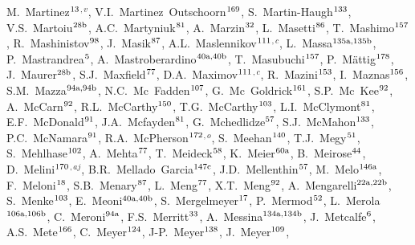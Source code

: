 \begin{flushleft}
M.~Martinez$^\textrm{\scriptsize 13}$$^{,v}$,
V.I.~Martinez~Outschoorn$^\textrm{\scriptsize 169}$,
S.~Martin-Haugh$^\textrm{\scriptsize 133}$,
V.S.~Martoiu$^\textrm{\scriptsize 28b}$,
A.C.~Martyniuk$^\textrm{\scriptsize 81}$,
A.~Marzin$^\textrm{\scriptsize 32}$,
L.~Masetti$^\textrm{\scriptsize 86}$,
T.~Mashimo$^\textrm{\scriptsize 157}$,
R.~Mashinistov$^\textrm{\scriptsize 98}$,
J.~Masik$^\textrm{\scriptsize 87}$,
A.L.~Maslennikov$^\textrm{\scriptsize 111}$$^{,c}$,
L.~Massa$^\textrm{\scriptsize 135a,135b}$,
P.~Mastrandrea$^\textrm{\scriptsize 5}$,
A.~Mastroberardino$^\textrm{\scriptsize 40a,40b}$,
T.~Masubuchi$^\textrm{\scriptsize 157}$,
P.~M\"attig$^\textrm{\scriptsize 178}$,
J.~Maurer$^\textrm{\scriptsize 28b}$,
S.J.~Maxfield$^\textrm{\scriptsize 77}$,
D.A.~Maximov$^\textrm{\scriptsize 111}$$^{,c}$,
R.~Mazini$^\textrm{\scriptsize 153}$,
I.~Maznas$^\textrm{\scriptsize 156}$,
S.M.~Mazza$^\textrm{\scriptsize 94a,94b}$,
N.C.~Mc~Fadden$^\textrm{\scriptsize 107}$,
G.~Mc~Goldrick$^\textrm{\scriptsize 161}$,
S.P.~Mc~Kee$^\textrm{\scriptsize 92}$,
A.~McCarn$^\textrm{\scriptsize 92}$,
R.L.~McCarthy$^\textrm{\scriptsize 150}$,
T.G.~McCarthy$^\textrm{\scriptsize 103}$,
L.I.~McClymont$^\textrm{\scriptsize 81}$,
E.F.~McDonald$^\textrm{\scriptsize 91}$,
J.A.~Mcfayden$^\textrm{\scriptsize 81}$,
G.~Mchedlidze$^\textrm{\scriptsize 57}$,
S.J.~McMahon$^\textrm{\scriptsize 133}$,
P.C.~McNamara$^\textrm{\scriptsize 91}$,
R.A.~McPherson$^\textrm{\scriptsize 172}$$^{,o}$,
S.~Meehan$^\textrm{\scriptsize 140}$,
T.J.~Megy$^\textrm{\scriptsize 51}$,
S.~Mehlhase$^\textrm{\scriptsize 102}$,
A.~Mehta$^\textrm{\scriptsize 77}$,
T.~Meideck$^\textrm{\scriptsize 58}$,
K.~Meier$^\textrm{\scriptsize 60a}$,
B.~Meirose$^\textrm{\scriptsize 44}$,
D.~Melini$^\textrm{\scriptsize 170}$$^{,aj}$,
B.R.~Mellado~Garcia$^\textrm{\scriptsize 147c}$,
J.D.~Mellenthin$^\textrm{\scriptsize 57}$,
M.~Melo$^\textrm{\scriptsize 146a}$,
F.~Meloni$^\textrm{\scriptsize 18}$,
S.B.~Menary$^\textrm{\scriptsize 87}$,
L.~Meng$^\textrm{\scriptsize 77}$,
X.T.~Meng$^\textrm{\scriptsize 92}$,
A.~Mengarelli$^\textrm{\scriptsize 22a,22b}$,
S.~Menke$^\textrm{\scriptsize 103}$,
E.~Meoni$^\textrm{\scriptsize 40a,40b}$,
S.~Mergelmeyer$^\textrm{\scriptsize 17}$,
P.~Mermod$^\textrm{\scriptsize 52}$,
L.~Merola$^\textrm{\scriptsize 106a,106b}$,
C.~Meroni$^\textrm{\scriptsize 94a}$,
F.S.~Merritt$^\textrm{\scriptsize 33}$,
A.~Messina$^\textrm{\scriptsize 134a,134b}$,
J.~Metcalfe$^\textrm{\scriptsize 6}$,
A.S.~Mete$^\textrm{\scriptsize 166}$,
C.~Meyer$^\textrm{\scriptsize 124}$,
J-P.~Meyer$^\textrm{\scriptsize 138}$,
J.~Meyer$^\textrm{\scriptsize 109}$,
$$
\end{flushleft}
